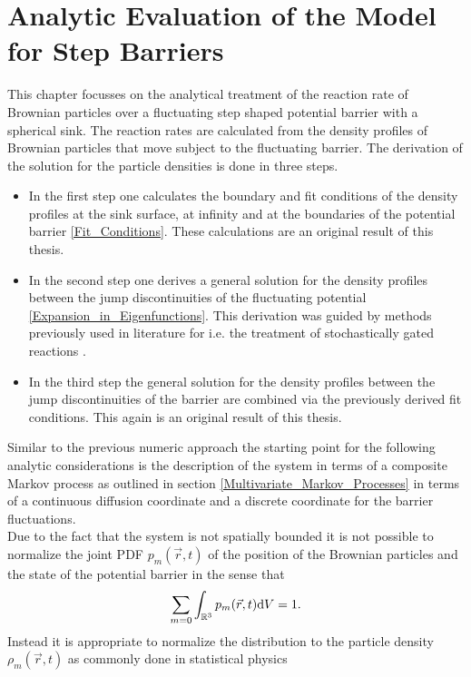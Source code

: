 
\chapter{Analytic Evaluation of the Model for Step Barriers}
\label{Reaction_Rates_over_Fluctuating_Barriers}
This chapter focusses on the analytical treatment of the reaction rate of Brownian particles over a fluctuating step shaped potential barrier with a spherical sink. The reaction rates are calculated from the density profiles of Brownian particles that move subject to the fluctuating barrier. The derivation of the solution for the particle densities is done in three steps.
\begin{itemize}
    \item In the first step one calculates the boundary and fit conditions of the density profiles at the sink surface, at infinity and at the boundaries of the potential barrier \ref{Fit_Conditions}. These calculations are an original result of this thesis. 
    \item In the second step one derives a general solution for the density profiles between the jump discontinuities of the fluctuating potential \ref{Expansion_in_Eigenfunctions}. This derivation was guided by methods previously used in literature for i.e. the treatment of stochastically gated reactions \cite{Szabo1982}. 
    \item In the third step the general solution for the density profiles between the jump discontinuities of the barrier are combined via the previously derived fit conditions. This again is an original result of this thesis.
\end{itemize}
Similar to the previous numeric approach the starting point for the following analytic considerations is the description of the system in terms of a composite Markov process as outlined in section \ref{Multivariate_Markov_Processes} in terms of a continuous diffusion coordinate and a discrete coordinate for the barrier fluctuations.\\
Due to the fact that the system is not spatially bounded it is not possible to normalize the joint PDF $p_m(\vec{r},t)$ of the position of the Brownian particles and the state of the potential barrier in the sense that 
\begin{equation}
    \sum_{m=0} \int_{\mathbb{R}^{3}} p_m(\vec{r},t) {\rm d}V = 1.
    \label{pdfNormalization}
\end{equation}
Instead it is appropriate to normalize the distribution to the particle density $\rho_m(\vec{r},t)$ as commonly done in statistical physics
